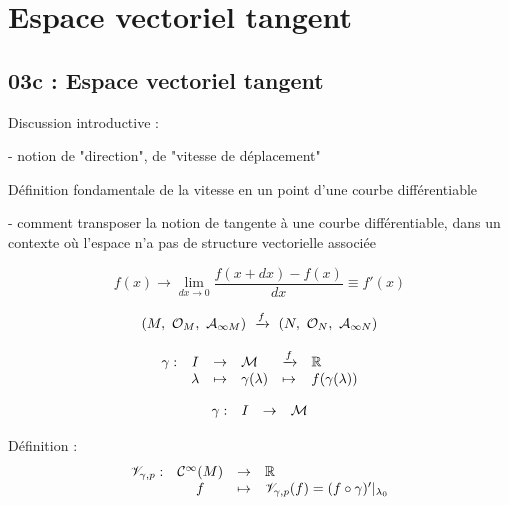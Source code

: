 \chapter{Espace vectoriel tangent} %
\section{03c : Espace vectoriel tangent}


Discussion introductive :

- notion de "direction", de "vitesse de déplacement"



Définition fondamentale de la vitesse en un point d'une courbe différentiable


- comment transposer la notion de tangente à une courbe différentiable, dans un contexte où l'espace n'a pas de structure vectorielle associée


\[
f(x) \to \lim_{dx\to 0}\frac{f(x+dx)-f(x)}{dx}\equiv f'(x)
\]


\[
(M,\ \mc{O}_M,\ \mc{A}_{\infty M})\ \xrightarrow{f}\ (N,\ \mc{O}_N,\ \mc{A}_{\infty N})
\]


\[
\begin{array}{ l c l l l l }
 \gamma : & I & \to & \mathcal{M} & \xrightarrow{f} & \mathbb{R} \\ 
  & \lambda & \mapsto & \gamma(\lambda) & \mapsto & f(\gamma(\lambda)) \\
\end{array}
\]


\[
\begin{array}{ l c l l }
 \gamma : & I & \to & \mathcal{M} \\
\end{array}
\]

Définition :
\[
\begin{array}{ l c l l }
 \mathscr{V}_{\gamma,p} : & \mathcal{C}^\infty(M) & \to & \mathbb{R} \\ 
  & f & \mapsto & \mathscr{V}_{\gamma,p}(f)=(f\circ\gamma)'|_{\lambda_0} \\
\end{array}
\]

